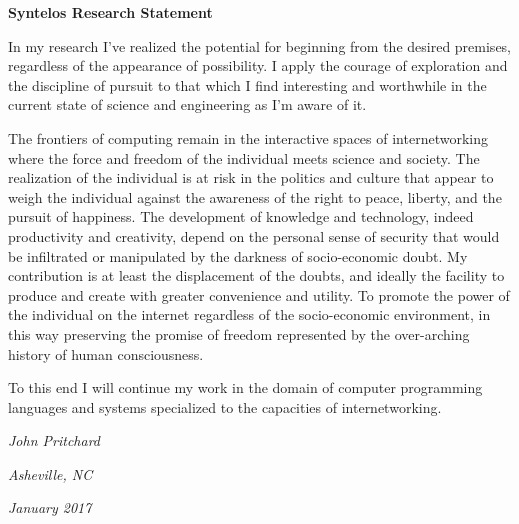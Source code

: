 

\bf Syntelos Research Statement

\bigskip

\rm

In my research I've realized the potential for beginning from the
desired premises, regardless of the appearance of possibility.  I
apply the courage of exploration and the discipline of pursuit to that
which I find interesting and worthwhile in the current state of
science and engineering as I'm aware of it.

The frontiers of computing remain in the interactive spaces of
internetworking where the force and freedom of the individual meets
science and society.  The realization of the individual is at risk in
the politics and culture that appear to weigh the individual against
the awareness of the right to peace, liberty, and the pursuit of
happiness.  The development of knowledge and technology, indeed
productivity and creativity, depend on the personal sense of security
that would be infiltrated or manipulated by the darkness of
socio-economic doubt.  My contribution is at least the displacement of
the doubts, and ideally the facility to produce and create with
greater convenience and utility.  To promote the power of the
individual on the internet regardless of the socio-economic
environment, in this way preserving the promise of freedom represented
by the over-arching history of human consciousness.  

To this end I will continue my work in the domain of computer
programming languages and systems specialized to the capacities of
internetworking.

\bigskip

{\it John Pritchard}

{\it Asheville, NC}

{\it January 2017}

\bye
